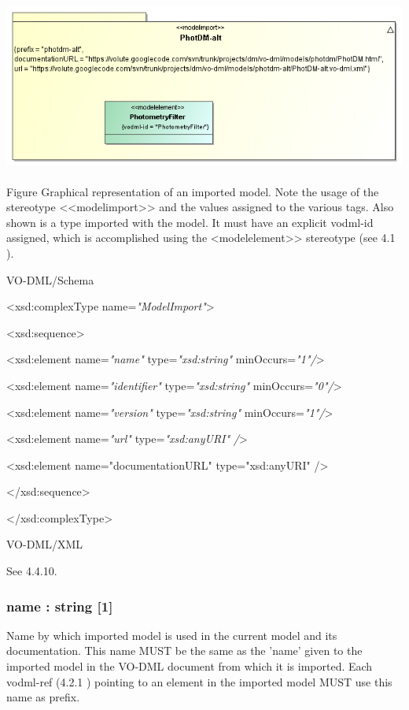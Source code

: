 \documentclass[10pt,a4paper]{ivoa}
\begin{document}
\includegraphics[width=5.51667in,height=2.20833in]{./media/image10.png}

Figure Graphical representation of an imported model. Note the usage of
the stereotype \textless\textless modelimport\textgreater\textgreater{}
and the values assigned to the various tags. Also shown is a type
imported with the model. It must have an explicit vodml-id assigned,
which is accomplished using the
\textless modelelement\textgreater\textgreater{} stereotype (see 4.1 ).

VO-DML/Schema

\textless xsd:complexType name=\emph{"ModelImport"}\textgreater{}

\textless xsd:sequence\textgreater{}

\textless xsd:element name=\emph{"name"} type=\emph{"xsd:string"}
minOccurs=\emph{"1"/}\textgreater{}

\textless xsd:element name=\emph{"identifier"} type=\emph{"xsd:string"}
minOccurs=\emph{"0"/}\textgreater{}

\textless xsd:element name=\emph{"version"} type=\emph{"xsd:string"}
minOccurs=\emph{"1"/}\textgreater{}

\textless xsd:element name=\emph{"url"} type=\emph{"xsd:anyURI"}
\emph{/}\textgreater{}

\textless xsd:element name="documentationURL" type="xsd:anyURI"
/\textgreater{}

\textless/xsd:sequence\textgreater{}

\textless/xsd:complexType\textgreater{}

VO-DML/XML

See 4.4.10.

\hypertarget{name-string-1-1}{%
\subsubsection{name : string {[}1{]}}\label{name-string-1-1}}

Name by which imported model is used in the current model and its
documentation. This name MUST be the same as the 'name' given to the
imported model in the VO-DML document from which it is imported. Each
vodml-ref (4.2.1 ) pointing to an element in the imported model MUST use
this name as prefix.
\end{document}

